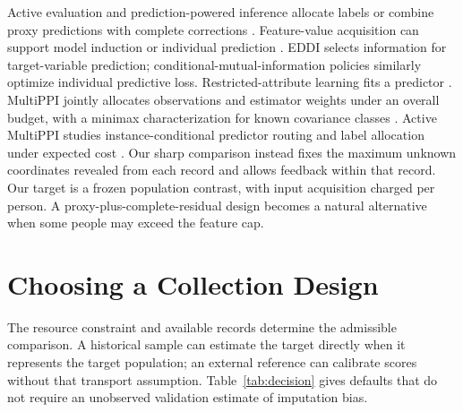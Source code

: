 Active evaluation and prediction-powered inference allocate labels or
combine proxy predictions with complete corrections
\citep{sawade2010,sawade2012,kossen2021,angelopoulos2023,zrnic2024,ppi2024}.
Feature-value acquisition can support model induction \citep{saartsechansky2009}
or individual prediction \citep{ma2019,covert2023,trapeznikov2013,nan2017,vonkleist2025}.
EDDI selects information for target-variable prediction; conditional-mutual-information
policies similarly optimize individual predictive loss. Restricted-attribute learning
fits a predictor \citep{bendavid1998,birkendorf1998,cesa2011}.
MultiPPI jointly allocates observations and estimator weights under an overall
budget, with a minimax characterization for known covariance classes
\citep{cowenbreen2026}. Active MultiPPI studies instance-conditional predictor
routing and label allocation under expected cost \citep{brawand2026}.
Our sharp comparison instead fixes the maximum unknown coordinates revealed
from each record and allows feedback within that record.
Our target is a frozen population contrast, with input acquisition charged
per person. A proxy-plus-complete-residual design becomes a natural
alternative when some people may exceed the feature cap.

\section{Choosing a Collection Design}\label{sec:guidance}
The resource constraint and available records determine the admissible
comparison. A historical sample can estimate the target directly when it
represents the target population; an external reference can calibrate scores
without that transport assumption. Table~\ref{tab:decision} gives defaults that do not require
an unobserved validation estimate of imputation bias.

